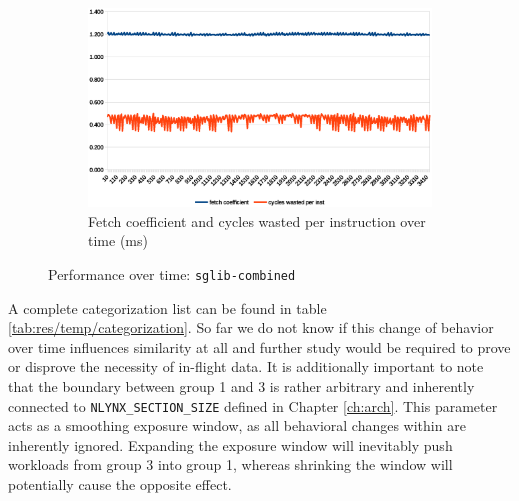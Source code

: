 \documentclass[../bachelor_paper.tex]{subfiles}
\begin{document}
\begin{figure}
\begin{subfigure}{0.45\textwidth}
        \includegraphics[width=\textwidth]{img/graph/embench/sglib-combined_fetch_waste.eps}
        \caption{Fetch coefficient and cycles wasted per instruction over time (ms)}
        \label{fig:res/sglib/fetch_waste}
    \end{subfigure}
    \caption{Performance over time: \texttt{sglib-combined}}
    \label{fig:res/sglib}
\end{figure}

A complete categorization list can be found in table \ref{tab:res/temp/categorization}. So far we do not know if this change of behavior over time influences similarity at all and further study would be required to prove or disprove the necessity of in-flight data. It is additionally important to note that the boundary between group 1 and 3 is rather arbitrary and inherently connected to \texttt{NLYNX\_SECTION\_SIZE} defined in Chapter \ref{ch:arch}. This parameter acts as a smoothing exposure window, as all behavioral changes within are inherently ignored. Expanding the exposure window will inevitably push workloads from group 3 into group 1, whereas shrinking the window will potentially cause the opposite effect.
\end{document}

